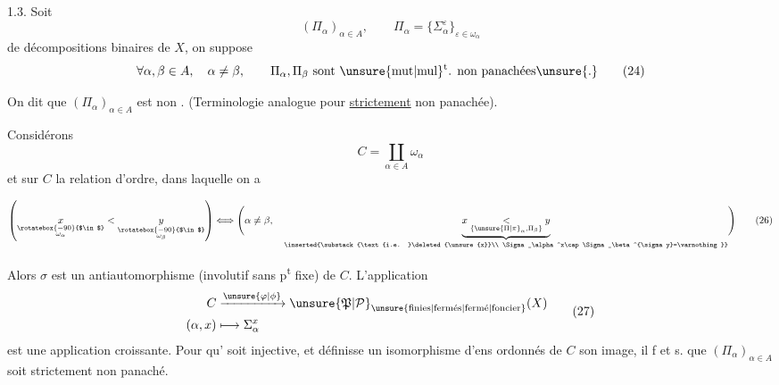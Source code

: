 1.3. Soit 
\[
(\Pi_\alpha)_{\alpha\in A},\qquad \Pi_\alpha=\{\Sigma_\alpha^\varepsilon\}_{\varepsilon\in\omega_\alpha}
\tag*{(23)}
\]
   de décompositions binaires de $X$, on suppose 
\[
\forall\alpha,\beta\in A,\quad\alpha\ne\beta,\qquad
\Pi_\alpha,\Pi_\beta\ \text{sont \unsure{mut|mul}\textsuperscript{t}. non panachées\unsure{.}}
\tag*{(24)}
\]

 On dit  que $(\Pi_\alpha)_{\alpha\in A}$ est non . (Terminologie analogue pour \uline{strictement} non panachée).

Considérons
\[
C=\coprod_{\alpha\in A}\omega_\alpha
\tag*{(25)}
\]
et sur $C$ la relation d'ordre, dans laquelle on a

\endgroup
\clearpage

\begingroup\makeatletter\tagsleft@true\makeatother
\[
\left(
\underset{\substack{\rotatebox{-90}{$\in$}\\\omega_\alpha}}{x}
<
\underset{\substack{\rotatebox{-90}{$\in$}\\\omega_\beta}}{y}
\right)
\Longleftrightarrow
\Biggl(\alpha\ne\beta,\quad
\underbrace{x\underset{\{\unsure{\Pi|\pi}_\alpha,\Pi_\beta\}}{<}y}_{
\inserted{\substack{\text{i.e. }\deleted{\unsure{x}}\\
\Sigma_\alpha^x\cap\Sigma_\beta^{\sigma y}=\varnothing}}}
\Biggr)
\tag*{(26)}
\]

Alors $\sigma$ est un antiautomorphisme (involutif sans p\textsuperscript{t} fixe) de $C$. L'application
\[
\begin{aligned}
C&\xrightarrow{\unsure{\varphi|\phi}}{\unsure{\mathfrak{P}|\mathcal{P}}}_{\unsure{\text{finies}|\text{fermés}|\text{fermé}|\text{foncier}}}(X)\\
(\alpha,x)&\longmapsto\Sigma_\alpha^x
\end{aligned}
\tag*{(27)}
\]
est une application croissante. Pour qu' soit injective, et définisse un isomorphisme d'ens ordonnés de $C$  son image, il f et s. que $(\Pi_\alpha)_{\alpha\in A}$ soit strictement non panaché.

